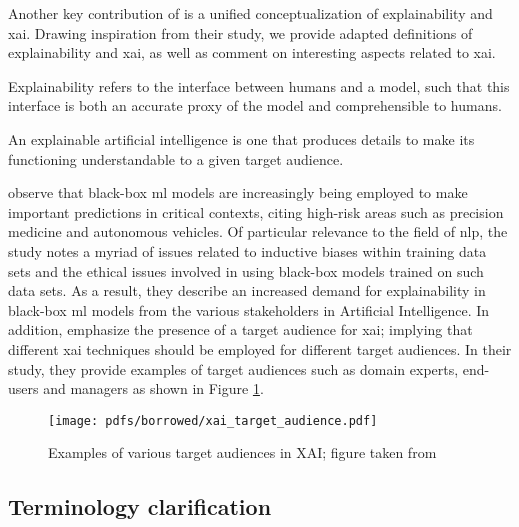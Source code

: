 Another key contribution of \citet{arrieta2020explainable} is a unified
conceptualization of explainability and \ac{xai}. Drawing inspiration from their
study, we provide adapted definitions of explainability and \ac{xai}, as well as
comment on interesting aspects related to \ac{xai}.

\begin{definition}
  Explainability refers to the interface between humans and a model, such that
  this interface is both an accurate proxy of the model and comprehensible to
  humans.
\end{definition}

\begin{definition}
  An explainable artificial intelligence is one that produces details to make
  its functioning understandable to a given target audience.
\end{definition}

\citet[Page 2, Section 1]{arrieta2020explainable} observe that black-box \ac{ml}
models are increasingly being employed to make important predictions in critical
contexts, citing high-risk areas such as precision medicine and autonomous
vehicles. Of particular relevance to the field of \ac{nlp}, the study notes a
myriad of issues related to inductive biases within training data sets and the
ethical issues involved in using black-box models trained on such data sets. As
a result, they describe an increased demand for explainability in black-box
\ac{ml} models from the various stakeholders in Artificial Intelligence. In
addition, \citet[Page 4, Section 2.2]{arrieta2020explainable} emphasize the
presence of a target audience for \ac{xai}; implying that different \ac{xai}
techniques should be employed for different target audiences. In their study,
they provide examples of target audiences such as domain experts, end-users and
managers as shown in Figure \ref{fig:xai_target_audience}.

\begin{figure}[t]
  \centering \texttt{[image: pdfs/borrowed/xai\_target\_audience.pdf]}
  \caption{Examples of various target audiences in XAI; figure taken from
    \citet{arrieta2020explainable}}
  \label{fig:xai_target_audience}
\end{figure}

\subsection{Terminology clarification}

